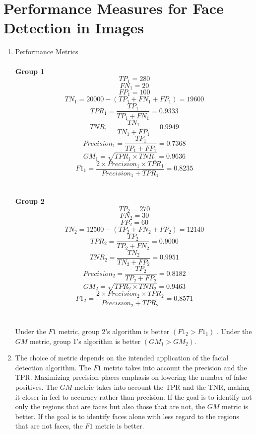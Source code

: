 \documentclass[english]{article}
\begin{document}
\section{Performance Measures for Face Detection in Images}
\begin{enumerate}
    \item Performance Metrics \\ \\
    \textbf{Group 1}
    $$TP_1 = 280$$
    $$FN_1 = 20$$
    $$FP_1 = 100$$
    $$TN_1 = 20000 - (TP_1 + FN_1 + FP_1) =19600$$
    $$TPR_1 = \frac{TP_1}{TP_1 + FN_1} = 0.9333$$
    $$TNR_1 = \frac{TN_1}{TN_1 + FP_1} = 0.9949$$
    $${Precision}_1 = \frac{TP_1}{TP_1 + FP_1} = 0.7368$$
    $$GM_1 = \sqrt{TPR_1 \times TNR_1} = 0.9636$$
    $$F1_1 = \frac{2 \times Precision_1 \times TPR_1}{Precision_1 + TPR_1} = 0.8235$$
    \\ \\ 
     \textbf{Group 2}
    $$TP_2 = 270$$
    $$FN_2 = 30$$
    $$FP_2 = 60$$
    $$TN_2 = 12500 - (TP_2 + FN_2 + FP_2) =12140$$
    $$TPR_2 = \frac{TP_2}{TP_2 + FN_2} = 0.9000$$
    $$TNR_2 = \frac{TN_2}{TN_2 + FP_2} = 0.9951$$
    $${Precision}_2 = \frac{TP_2}{TP_2 + FP_2} = 0.8182$$
    $$GM_2 = \sqrt{TPR_2 \times TNR_2} = 0.9463$$
    $$F1_2 = \frac{2 \times Precision_2 \times TPR_2}{Precision_2 + TPR_2} = 0.8571$$ 
    \\ \\
    Under the $F1$ metric, group 2's algorithm is better $(F1_2 > F1_1)$ . Under the $GM$ metric, group 1's algorithm is better $(GM_1 > GM_2)$. 
    \item The choice of metric depends on the intended application of the facial detection algorithm. The $F1$ metric takes into account the precision and the TPR. Maximizing precision places emphasis on lowering the number of false positives. The $GM$ metric takes into account the TPR and the TNR, making it closer in feel to accuracy rather than precision. If the goal is to identify not only the regions that are faces but also those that are not, the $GM$ metric is better. If the goal is to identify faces alone with less regard to the regions that are not faces, the $F1$ metric is better. 
    \end{enumerate}
\end{document}
